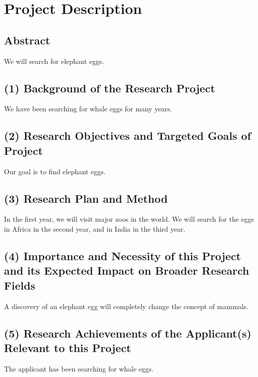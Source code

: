 \documentclass[11pt,a4j,dvipdfmx]{jarticle} 					%
\newcommand{\研究課題名}{象の卵}
\newcommand{\研究機関名}{逢坂大学}
\newcommand{\研究代表者氏名}{湯川秀樹}
\newcommand{\研究期間の最終元号年度}{8}  %
\begin{document}

\section{Project Description}

	\vspace*{-12mm}
\subsection*{Abstract}
	We will search for elephant eggs.
	
\subsection*{(1) Background of the Research Project}
	We have been searching for whale eggs for many years.
	
\subsection*{(2) Research Objectives and Targeted Goals of Project}
	Our goal is to find elephant eggs.

\subsection*{(3) Research Plan and Method}
	In the first year, we will visit major zoos in the world.
	We will search for the eggs in Africa in the second year, 
	and in India in the third year.
	
\subsection*{(4) Importance and Necessity of this Project and its Expected Impact on Broader Research Fields}
	A discovery of an elephant egg will completely change the concept of mammals.

\subsection*{(5) Research Achievements of the Applicant(s) Relevant to this Project}
	The applicant has been searching for whale eggs.
	
\JSPSInstructions	%
\end{document}
